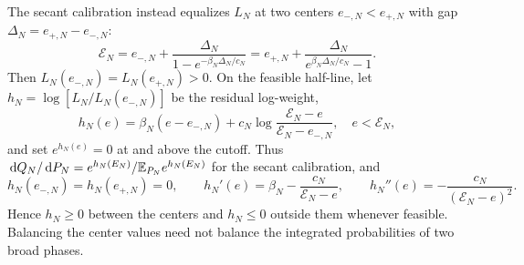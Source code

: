 The secant calibration instead equalizes $L_N$ at two centers
$e_{-,N}<e_{+,N}$ with gap $\Delta_N=e_{+,N}-e_{-,N}$:
\begin{equation}
 \mathcal E_N=e_{-,N}+
 \frac{\Delta_N}{1-e^{-\beta_N\Delta_N/c_N}}
 =e_{+,N}+\frac{\Delta_N}{e^{\beta_N\Delta_N/c_N}-1}.
 \label{eq:secant-calibration}
\end{equation}
Then $L_N(e_{-,N})=L_N(e_{+,N})>0$. On the feasible half-line, let
$h_N=\log[L_N/L_N(e_{-,N})]$ be the residual log-weight,
\begin{equation}
 h_N(e)=\beta_N(e-e_{-,N})+
 c_N\log\frac{\mathcal E_N-e}{\mathcal E_N-e_{-,N}},
 \quad e<\mathcal E_N,
 \label{eq:secant-h}
\end{equation}
and set $e^{h_N(e)}=0$ at and above the cutoff. Thus
$\,\mathrm d Q_N/\,\mathrm d P_N=e^{h_N(E_N)}/\mathbb E_{P_N}e^{h_N(E_N)}$ for the secant
calibration, and
\begin{equation}
 h_N(e_{-,N})=h_N(e_{+,N})=0,\qquad
 h_N'(e)=\beta_N-\frac{c_N}{\mathcal E_N-e},\qquad
 h_N''(e)=-\frac{c_N}{(\mathcal E_N-e)^2}.
 \label{eq:secant-derivatives}
\end{equation}
Hence $h_N\ge0$ between the centers and $h_N\le0$ outside them
whenever feasible. Balancing the center values need not balance the
integrated probabilities of two broad phases.

